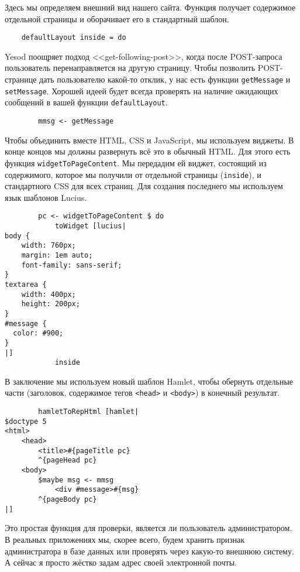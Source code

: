 Здесь мы определяем внешний вид нашего сайта. Функция получает содержимое отдельной страницы и оборачивает его в стандартный шаблон. 
 
\begin{lstlisting}
    defaultLayout inside = do
\end{lstlisting}
 
Yesod поощряет подход <<get-following-post>>, когда после POST-запроса пользователь перенаправляется на другую страницу. Чтобы позволить POST-странице дать пользователю какой-то отклик, у нас есть функции \lstinline!getMessage! и \lstinline!setMessage!. Хорошей идеей будет всегда проверять на наличие ожидающих сообщений в вашей функции \lstinline!defaultLayout!. 
 
\begin{lstlisting}
        mmsg <- getMessage
\end{lstlisting}

Чтобы объединить вместе HTML, CSS и JavaScript, мы используем виджеты. В конце концов мы должны развернуть всё это в обычный HTML. Для этого есть функция \lstinline!widgetToPageContent!. Мы передадим ей виджет, состоящий из содержимого, которое мы получили от отдельной страницы (\lstinline!inside!), и стандартного CSS для всех страниц. Для создания последнего мы используем язык шаблонов Lucius. 
 
\begin{lstlisting}
        pc <- widgetToPageContent $ do
            toWidget [lucius|
body {
    width: 760px;
    margin: 1em auto;
    font-family: sans-serif;
}
textarea {
    width: 400px;
    height: 200px;
}
#message {
  color: #900;
}
|]
            inside
\end{lstlisting}%
 
В заключение мы используем новый шаблон Hamlet, чтобы обернуть отдельные части (заголовок, содержимое тегов \lstinline!<head>! и \lstinline!<body>!) в конечный результат. 
 
\begin{lstlisting}
        hamletToRepHtml [hamlet|
$doctype 5
<html>
    <head>
        <title>#{pageTitle pc}
        ^{pageHead pc}
    <body>
        $maybe msg <- mmsg
            <div #message>#{msg}
        ^{pageBody pc}
|]
\end{lstlisting}
 
Это простая функция для проверки, является ли пользователь администратором. В реальных приложениях мы, скорее всего, будем хранить признак администратора в базе данных или проверять через какую-то внешнюю систему. А сейчас я просто жёстко задам адрес своей электронной почты. 
 
